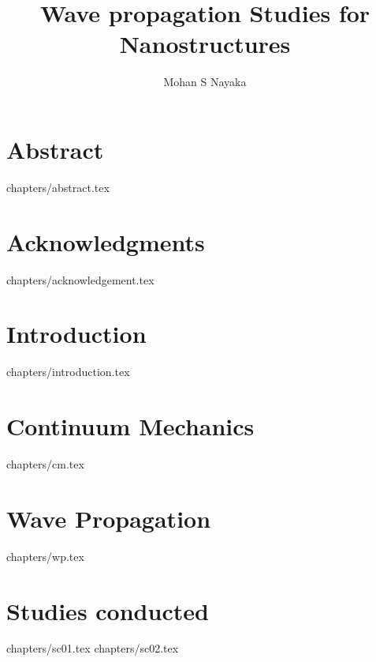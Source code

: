\documentclass[12pt,a4paper,oneside,openright,titlepage]{report}
\author{Mohan S Nayaka}
\title{Wave propagation Studies for Nanostructures}
\begin{document}
\maketitle
\tableofcontents
\listoffigures
\chapter* {Abstract}
 {chapters/abstract.tex}
\chapter* {Acknowledgments}
 {chapters/acknowledgement.tex}
\chapter {Introduction}
 {chapters/introduction.tex}
\chapter {Continuum Mechanics}
 {chapters/cm.tex}
\chapter {Wave Propagation}
 {chapters/wp.tex}
\chapter {Studies conducted}
 {chapters/sc01.tex}
 {chapters/sc02.tex}


\end{document}
